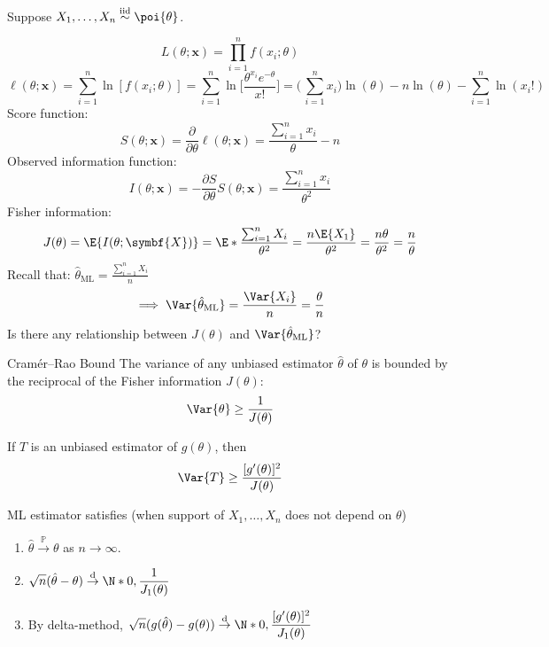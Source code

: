 \begin{Example}{}{}
    Suppose $ X_1,\ldots,X_n\stackrel{\text{iid}}{\sim}\poi{\theta} $.

    \[ L(\theta;\symbf{x})=\prod_{i=1}^n f(x_i;\theta) \]
    \[ \ell(\theta;\symbf{x})=\sum_{i=1}^{n}
        \ln[f(x_i;\theta)]=\sum_{i=1}^{n}
        \ln\biggl[\frac{\theta^{x_i}e^{-\theta}}{x!} \biggr]=
        \biggl(\,\sum_{i=1}^{n} x_i\biggr)\ln(\theta)-
        n\ln(\theta)-\sum_{i=1}^{n} \ln(x_i!) \]
    Score function:
    \[ S(\theta;\symbf{x})=\frac{\partial}{\partial\theta}\ell(\theta;\symbf{x})
        =\frac{\sum_{i=1}^{n} x_i}{\theta}-n   \]
    Observed information function:
    \[ I(\theta;\symbf{x})=
        -\frac{\partial S}{\partial \theta}S(\theta;\symbf{x})
        =\frac{\sum_{i=1}^{n} x_i}{\theta^2}   \]
    Fisher information:
    \[ J(\theta)=\E{I(\theta;\symbf{X})}=
        \E*{\frac{\sum_{i=1}^{n} X_i}{\theta^2}}=
        \frac{n\E{X_1}}{\theta^2}=\frac{n\theta}{\theta^2}=\frac{n}{\theta}  \]
    Recall that: $ \displaystyle \hat{\theta}_{\text{ML}}=\frac{\sum_{i=1}^{n} X_i}{n} $
    \[ \implies \Var{\hat{\theta}_{\text{ML}}}=
        \frac{\Var{X_i}}{n}=\frac{\theta}{n}  \]
    Is there any relationship between $ J(\theta) $
    and $ \Var{\hat{\theta}_{\text{ML}}} $?
\end{Example}
\begin{Theorem}{Cramér–Rao Bound}{}
    The variance of any unbiased estimator
    $ \hat{\theta} $ of $ \theta $ is bounded by the reciprocal
    of the Fisher information $ J(\theta) $:
    \[ \Var{\theta}\ge \frac{1}{J(\theta)}  \]
\end{Theorem}
\begin{Corollary}{}{}
    If $ T $ is an unbiased estimator of $ g(\theta) $, then
    \[ \Var{T}\ge \frac{[g^\prime(\theta)]^2}{J(\theta)} \]
\end{Corollary}
\begin{Theorem}{}{}
    ML estimator satisfies (when support of $ X_1,\ldots,X_n $
    does not depend on $ \theta $)
    \begin{enumerate}[label=(\arabic*)]
        \item $ \hat{\theta}\stackrel{\mathbb{P}}{\to}\theta $
              as $ n\to\infty $.
        \item $ \displaystyle \sqrt{n}(\hat{\theta}-\theta)\stackrel{\text{d}}{\to}
                  \N*{0,\frac{1}{J_1(\theta)}} $
        \item By delta-method,
              $ \displaystyle \sqrt{n}(g(\hat{\theta})-g(\theta))\stackrel{\text{d}}{\to}
                  \N*{0,\frac{[g^\prime(\theta)]^2}{J_1(\theta)} } $
    \end{enumerate}
\end{Theorem}

